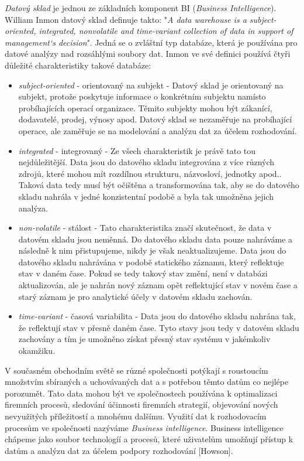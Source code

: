 \textit{Datový sklad} je jednou ze základních komponent BI (\textit{Business Intelligence}). William Inmon datový sklad definuje takto: "\textit{A data warehouse is a subject-oriented, integrated, nonvolatile and time-variant collection of data in support of management`s decision}". Jedná se o zvláštní typ databáze, která je používána pro datové analýzy nad rozsáhlými soubory dat. Inmon ve své definici používá čtyři důležité charakteristiky takové databáze:
\begin{itemize}
  \item \textit{subject-oriented} - orientovaný na subjekt - Datový sklad je orientovaný na subjekt, protože poskytuje informace o konkrétním subjektu namísto probíhajících operací organizace. Těmito subjekty mohou být zákanící, dodavatelé, prodej, výnosy apod. Datový sklad se nezaměřuje na probíhající operace, ale zaměřuje se na modelování a analýzu dat za účelem rozhodování.
  \item \textit{integrated} - integrovaný - Ze všech charakteristik je právě tato tou nejdůležitější. Data jsou do datového skladu integrována z více různých zdrojů, které mohou mít rozdílnou strukturu, názvosloví, jednotky apod.. Taková data tedy musí být očištěna a transformována tak, aby se do datového skladu nahrála v jedné konzistentní podobě a byla tak umožněna jejich analýza.  
  \item \textit{non-volatile} - stálost - Tato charakteristika značí skutečnost, že data v datovém skladu jsou neměnná. Do datového skladu data pouze nahráváme a následně k nim přistupujeme, nikdy je však neaktualizujeme. Data jsou do datového skladu nahrávána v podobě statického záznamu, který reflektuje stav v daném čase. Pokud se tedy takový stav změní, není v databázi aktualizován, ale je nahrán nový záznam opět reflektující stav v novém čase a starý záznam je pro analytické účely v datovém skladu zachován.
  \item \textit{time-variant} - časová variabilita - Data jsou do datového skladu nahrána tak, že reflektují stav v přesně daném čase. Tyto stavy jsou tedy v datovém skladu zachovány a tím je umožněno získat přesný stav systému v jakémkoliv okamžiku.
\end{itemize}

V současném obchodním světě se různé společnosti potýkají s roustoucím množstvím sbíraných a uchovávaných dat a s potřebou těmto datům co nejlépe porozumět. Tato data mohou být ve společnostech používána k optimalizaci firemních procesů, sledování účinnosti firemních strategií, objevování nových nevyužitých příležitostí a mnohému dalšímu. Využití dat k rozhodovacím procesům ve společnosti nazýváme \textit{Business intelligence}. Business intelligence chápeme jako soubor technologíí a procesů, které uživatelům umožňují přístup k datům a analýzu dat za účelem podpory rozhodování [Howson]. 

